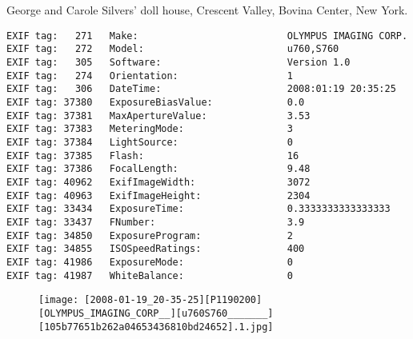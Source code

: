 \section{\protect{}}
\noindent George and Carole Silvers' doll house, Crescent Valley, Bovina Center, New York.
\noindent
\begin{lstlisting}
EXIF tag:   271   Make:                          OLYMPUS IMAGING CORP.  
EXIF tag:   272   Model:                         u760,S760       
EXIF tag:   305   Software:                      Version 1.0                    
EXIF tag:   274   Orientation:                   1
EXIF tag:   306   DateTime:                      2008:01:19 20:35:25
EXIF tag: 37380   ExposureBiasValue:             0.0
EXIF tag: 37381   MaxApertureValue:              3.53
EXIF tag: 37383   MeteringMode:                  3
EXIF tag: 37384   LightSource:                   0
EXIF tag: 37385   Flash:                         16
EXIF tag: 37386   FocalLength:                   9.48
EXIF tag: 40962   ExifImageWidth:                3072
EXIF tag: 40963   ExifImageHeight:               2304
EXIF tag: 33434   ExposureTime:                  0.3333333333333333
EXIF tag: 33437   FNumber:                       3.9
EXIF tag: 34850   ExposureProgram:               2
EXIF tag: 34855   ISOSpeedRatings:               400
EXIF tag: 41986   ExposureMode:                  0
EXIF tag: 41987   WhiteBalance:                  0

\end{lstlisting}
\clearpage
\begin{figure}
\raggedleft
\texttt{[image: [2008-01-19\_20-35-25][P1190200][OLYMPUS\_IMAGING\_CORP\_\_][u760S760\_\_\_\_\_\_\_][105b77651b262a04653436810bd24652].1.jpg]}
\end{figure}


\clearpage
